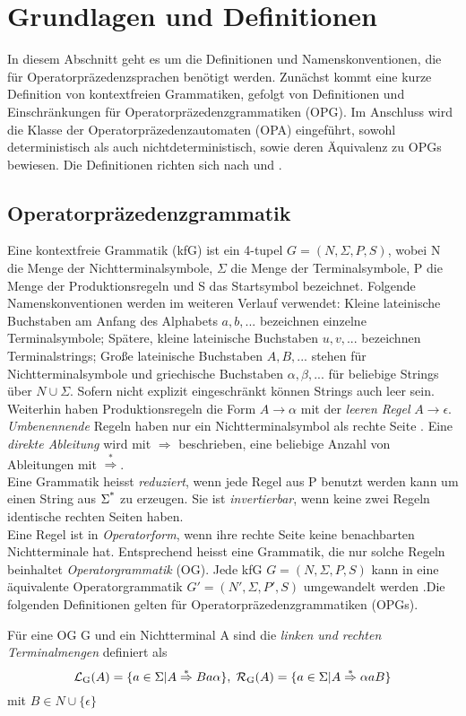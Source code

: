 \section{Grundlagen und Definitionen}
In diesem Abschnitt geht es um die Definitionen und Namenskonventionen, die für Operatorpräzedenzsprachen benötigt werden. Zunächst kommt eine kurze Definition von kontextfreien Grammatiken, gefolgt von Definitionen und Einschränkungen für Operatorpräzedenzgrammatiken (OPG). Im Anschluss wird die Klasse der Operatorpräzedenzautomaten (OPA) eingeführt, sowohl deterministisch als auch nichtdeterministisch, sowie deren Äquivalenz zu OPGs bewiesen. Die Definitionen richten sich nach \cite{precedence_automata} \cite{mso} und \cite{op_vpl_property}.
\subsection{Operatorpräzedenzgrammatik}
Eine kontextfreie Grammatik (kfG) ist ein 4-tupel $G = (N, \Sigma, P, S)$, wobei N die Menge der Nichtterminalsymbole, $\Sigma$ die Menge der Terminalsymbole, P die Menge der Produktionsregeln und S das Startsymbol bezeichnet. Folgende Namenskonventionen werden im weiteren Verlauf verwendet: Kleine lateinische Buchstaben am Anfang des Alphabets $a, b, ...$ bezeichnen einzelne Terminalsymbole; Spätere, kleine lateinische Buchstaben $u,v, ...$ bezeichnen Terminalstrings; Große lateinische Buchstaben $A, B, ...$ stehen für Nichtterminalsymbole und griechische Buchstaben $\alpha, \beta, ...$ für beliebige Strings über $N \cup \Sigma$. Sofern nicht explizit eingeschränkt können Strings auch leer sein.\\
Weiterhin haben Produktionsregeln die Form $A \rightarrow \alpha$ mit der \textit{leeren Regel} $A \rightarrow \epsilon$. \textit{Umbenennende} Regeln haben nur ein Nichtterminalsymbol als rechte Seite . Eine \textit{direkte Ableitung} wird mit $\Rightarrow$ beschrieben, eine beliebige Anzahl von Ableitungen mit $\overset{*}{\Rightarrow}$.
\\
Eine Grammatik heisst \textit{reduziert}, wenn jede Regel aus P benutzt werden kann um einen String aus $\Sigma\textsuperscript{*}$ zu erzeugen. Sie ist \textit{invertierbar}, wenn keine zwei Regeln identische rechten Seiten haben.\\
Eine Regel ist in \textit{Operatorform}, wenn ihre rechte Seite keine benachbarten Nichtterminale hat. Entsprechend heisst eine Grammatik, die nur solche Regeln beinhaltet \textit{Operatorgrammatik} (OG). Jede kfG $G=(N,\Sigma, P, S)$ kann in eine äquivalente Operatorgrammatik $G'=(N', \Sigma, P', S)$ umgewandelt werden \cite{og, salomaa1973formal}.Die folgenden Definitionen gelten für Operatorpräzedenzgrammatiken (OPGs). \\
\begin{definition}

Für eine OG G und ein Nichtterminal A sind die \textit{linken und rechten Terminalmengen}  definiert als 
$$ \mathcal{L} \textsubscript{G}(A) = \{ a \in \Sigma | A \overset{*}{\Rightarrow} Ba \alpha \}, \;
 \mathcal{R} \textsubscript{G}(A) = \{ a \in \Sigma | A \overset{*}{\Rightarrow} \alpha aB \}$$
mit $B \in N \cup \{\epsilon\}$
\end{definition}

